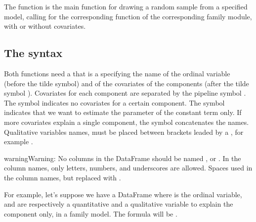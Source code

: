 \documentclass[letterpaper,10pt,english]{sphinxmanual}
\begin{document}
\sphinxAtStartPar
The function  is the main function for drawing a random sample from a specified model,
calling for the corresponding  function of the corresponding family module,
with or without covariates.

\sphinxAtStartPar
{}


\subsection{The  syntax}
\label{\detokenize{manual:the-formula-syntax}}
\sphinxAtStartPar
Both functions need a  that is a  specifying the name of the ordinal
variable (before the tilde \sphinxcode{\sphinxupquote{\textasciitilde{}}} symbol)
and of the covariates of the components (after the tilde symbol \sphinxcode{\sphinxupquote{\textasciitilde{}}}).
Covariates for each component are
separated by the pipeline symbol \sphinxcode{\sphinxupquote{|}}.
The  symbol  indicates no covariates for a certain component.
The  symbol  indicates that we want to estimate the parameter of the constant term only.
If more covariates explain a single component, the symbol \sphinxcode{\sphinxupquote{+}} concatenates the names.
Qualitative variables names, must be placed between brackets \sphinxcode{\sphinxupquote{()}} leaded by a ,
for example .

\begin{sphinxadmonition}{warning}{Warning:}
\sphinxAtStartPar
No columns in the DataFrame should be named ,  or .
In the column names, only letters, numbers, and underscores \sphinxcode{\sphinxupquote{\_}} are allowed.
Spaces  used in the column names, but replaced with \sphinxcode{\sphinxupquote{\_}}.
\end{sphinxadmonition}

\sphinxAtStartPar
For example, let’s suppose we have a DataFrame where  is the ordinal variable,
 and  are respectively a quantitative and a qualitative variable to explain the  component
only, in a  family model. The formula will be .
\end{document}

